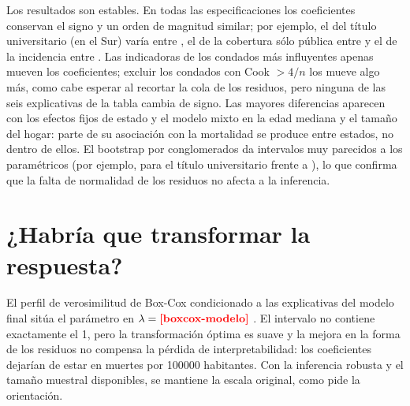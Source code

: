 


Los resultados son estables. En todas las especificaciones los coeficientes conservan el signo y
un orden de magnitud similar; por ejemplo, el del título universitario (en el Sur) varía entre
, el de la cobertura sólo pública entre  y el de la
incidencia entre . Las indicadoras de los  condados más
influyentes apenas mueven los coeficientes; excluir los  condados con Cook $>4/n$
los mueve algo más, como cabe esperar al recortar la cola de los residuos, pero ninguna de las
seis explicativas de la tabla cambia de signo. Las mayores diferencias aparecen con los efectos fijos de
estado y el modelo mixto en la edad mediana y el tamaño del hogar: parte de su asociación con la
mortalidad se produce entre estados, no dentro de ellos. El bootstrap por conglomerados da
intervalos muy parecidos a los paramétricos (por ejemplo,  para el título
universitario frente a ), lo que confirma que la falta de normalidad de los
residuos no afecta a la inferencia.

\section{¿Habría que transformar la respuesta?}

El perfil de verosimilitud de Box-Cox condicionado a las explicativas del modelo final sitúa el
parámetro en $\lambda=\res{boxcox-modelo}$ . El intervalo no contiene
exactamente el 1, pero la transformación óptima es suave y la mejora en la forma de los residuos
no compensa la pérdida de interpretabilidad: los coeficientes dejarían de estar en muertes por
\num{100000} habitantes. Con la inferencia robusta y el tamaño muestral disponibles, se mantiene la
escala original, como pide la orientación.
